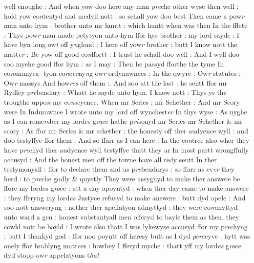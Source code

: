 \documentclass[12pt, a4paper]{book}
\begin{document}
      				
      				well enoughe : And when yow doo here any man p\textit{re}che other wyse then  well : hold yow co\textit{n}tentyd and medyll nott : so schall yow doo best Then came a pow\textit{r} man unto hym : brother unto mr huntt : which huntt when was 
			then In the fflete : Thys pow\textit{r} man made petytyon unto hym ffor hys brother : my lord sayde : I have byn long ow\textit{t} off y\textit{n}glond : I here off yow\textit{r} brother : butt I know nott the matt\textit{er} : Be yow off good co\textit{n}ffortt : I trust he schall doo well : And I wyll doo soo myche good ffor hym : as I may : Then he passyd fforthe the tyme In co\textit{m}munyca- tyon co\textit{n}c\textit{er}ny\textit{n}g ow\textit{r} ordynawnces : In the qwyre : Ow\textit{r} statutes : Ow\textit{r} massys And how\textit{res} off them :. And soo att the last : he sentt ffor mr Rydley p\textit{re}bendary : Whatt he sayde unto hym. I know nott : Thys ys the  trougthe uppo\textit{n} my co\textit{n}scyence. When mr Serles : mr Schether : And mr Scory were In Indurawnce I wrote unto my lord off wynchest\textit{er} In thys wyse : As nyghe as I can reme\textit{m}ber my lordes g\textit{ra}ce hathe p\textit{ri}sonyd mr Serles mr Schether \& mr scory : As ffor  mr Serles \& mr schether : the honesty off ther audyence wyll : and doo  testyffye ffor them : And so ffarr as I can here : In the co\textit{n}tree also wher they have p\textit{re}chyd ther audyence wyll testyffye thatt they ar In  most partt wrongffully accusyd : And the honest men off the towne  have all redy sentt In ther testymonyall : ffor to declare them and us p\textit{re}bendarys : so ffarr as ev\textit{er} they herd : to p\textit{re}che godly \& quyetly They were assygnyd to make ther answere be ffore my lordes g\textit{ra}ce : att a day apoyntyd : when ther day came to make answere : they fferyng my lord\textit{es} Justyce refusyd to make answere : butt dyd apele : And soo nott answeryng : nother ther apellatyon admyttyd : they were co\textit{m}myttyd unto ward a gen : honest substantyall men offeryd to bayle them as then. they cowld nott be bayld : I wrote also thatt I was lykewyse accusyd ffor my p\textit{re}chyng : butt I thankyd god : ffor noo poyntt off heresy butt as I dyd \textit{per}ceyve : hytt was onely ffor brablyng matt\textit{er}s : howbey I fferyd myche : thatt yff my lord\textit{es }g\textit{ra}ce dyd stopp ow\textit{r} appelatyons t\textit{hat}
      				
\dotfill
					
\end{document}

